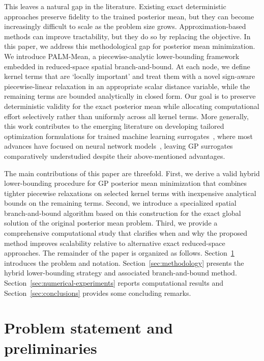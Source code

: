 \documentclass[pdflatex,sn-mathphys-num]{sn-jnl}%
\theoremstyle{thmstyleone}%
\theoremstyle{thmstyletwo}%
\theoremstyle{thmstylethree}%
\begin{document}
This leaves a natural gap in the literature. Existing exact deterministic approaches preserve fidelity to the trained posterior mean, but they can become increasingly difficult to scale as the problem size grows. Approximation-based methods can improve tractability, but they do so by replacing the objective. In this paper, we address this methodological gap for posterior mean minimization. We introduce PALM-Mean, a piecewise-analytic lower-bounding framework embedded in reduced-space spatial branch-and-bound. At each node, we define kernel terms that are `locally important' and treat them with a novel sign-aware piecewise-linear relaxation in an appropriate scalar distance variable, while the remaining terms are bounded analytically in closed form. Our goal is to preserve deterministic validity for the exact posterior mean while allocating computational effort selectively rather than uniformly across all kernel terms. 
More generally, this work contributes to the emerging literature on developing tailored optimization formulations for trained machine learning surrogates~\cite{misener2023formulating,ref:mlopt_review}, where most advances have focused on neural network models~\cite{anderson2020strong,grimstad2019relu,huchette2026deep,tsay2021partition}, leaving GP surrogates comparatively understudied despite their above-mentioned advantages.

The main contributions of this paper are threefold. First, we derive a valid hybrid lower-bounding procedure for GP posterior mean minimization that combines tighter piecewise relaxations on selected kernel terms with inexpensive analytical bounds on the remaining terms. Second, we introduce a specialized spatial branch-and-bound algorithm based on this construction for the exact global solution of the original posterior mean problem. Third, we provide a comprehensive computational study that clarifies when and why the proposed method improves scalability relative to alternative exact reduced-space approaches. The remainder of the paper is organized as follows. Section~\ref{sec:prob-statement} introduces the problem and notation. Section~\ref{sec:methodology} presents the hybrid lower-bounding strategy and associated branch-and-bound method. Section~\ref{sec:numerical-experiments} reports computational results and Section~\ref{sec:conclusions} provides some concluding remarks.

\section{Problem statement and preliminaries}
\label{sec:prob-statement}
\end{document}
